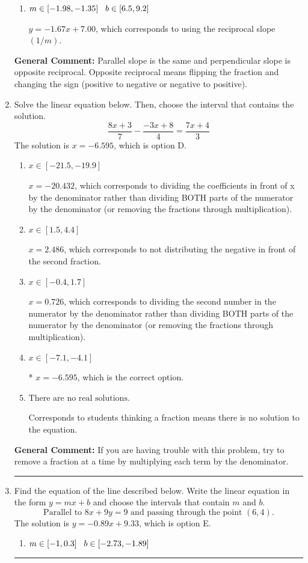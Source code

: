 \documentclass{extbook}[14pt]
\newcommand{\litem}[1]{\item #1

\rule{\textwidth}{0.4pt}}
\begin{document}
\begin{enumerate}
{\begin{enumerate}[label=\Alph*.]
 $y = 0.60x + 1.00$, which corresponds to using the negative slope.
\item \( m \in [-1.98, -1.35] \hspace*{3mm} b \in [6.5, 9.2] \)

 $y = -1.67x + 7.00$, which corresponds to using the reciprocal slope $(1/m)$.
\end{enumerate}

\textbf{General Comment:} Parallel slope is the same and perpendicular slope is opposite reciprocal. Opposite reciprocal means flipping the fraction and changing the sign (positive to negative or negative to positive).
}
\litem{
Solve the linear equation below. Then, choose the interval that contains the solution.
\[ \frac{8x + 3}{7} - \frac{-3x + 8}{4} = \frac{7x + 4}{3} \]The solution is \( x = -6.595 \), which is option D.\begin{enumerate}[label=\Alph*.]
\item \( x \in [-21.5, -19.9] \)

 $x = -20.432$, which corresponds to dividing the coefficients in front of x by the denominator rather than dividing BOTH parts of the numerator by the denominator (or removing the fractions through multiplication).
\item \( x \in [1.5, 4.4] \)

 $x = 2.486$, which corresponds to not distributing the negative in front of the second fraction.
\item \( x \in [-0.4, 1.7] \)

 $x = 0.726$, which corresponds to dividing the second number in the numerator by the denominator rather than dividing BOTH parts of the numerator by the denominator (or removing the fractions through multiplication).
\item \( x \in [-7.1, -4.1] \)

* $x = -6.595$, which is the correct option.
\item \( \text{There are no real solutions.} \)

Corresponds to students thinking a fraction means there is no solution to the equation.
\end{enumerate}

\textbf{General Comment:} If you are having trouble with this problem, try to remove a fraction at a time by multiplying each term by the denominator.
}
\litem{
Find the equation of the line described below. Write the linear equation in the form $ y=mx+b $ and choose the intervals that contain $m$ and $b$.
\[ \text{Parallel to } 8 x + 9 y = 9 \text{ and passing through the point } (6, 4). \]The solution is \( y = -0.89x + 9.33 \), which is option E.\begin{enumerate}[label=\Alph*.]
\item \( m \in [-1, 0.3] \hspace*{3mm} b \in [-2.73, -1.89] \)


\end{enumerate}}
\end{enumerate}
\end{document}
